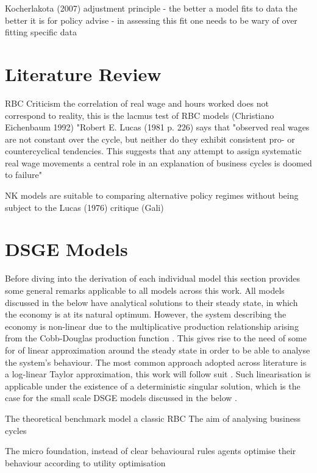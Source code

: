 \documentclass[12pt,a4paper,english]{article} %
\let\oldsection\section
\renewcommand\section{\clearpage\oldsection}
\begin{document}
	Kocherlakota (2007) adjustment principle
	- the better a model fits to data the better it is for policy advise
	- in assessing this fit one needs to be wary of over fitting specific data
	
	\section{Literature Review}
		RBC Criticism
	the correlation of real wage and hours worked does not correspond to reality, this is the lacmus test of RBC models (Christiano Eichenbaum 1992)
	"Robert E. Lucas (1981 p. 226) says that "observed real wages are not constant over the cycle, but neither do they exhibit consistent pro- or countercyclical tendencies. This suggests that any attempt to assign systematic real wage movements a central role in an explanation of business cycles is doomed to failure" \cite{christiano_current_1992}
	
	NK models are suitable to comparing alternative policy regimes without being subject to the Lucas (1976) critique (Gali)	



	\section{DSGE Models}
	
	Before diving into the derivation of each individual model this section provides some general remarks applicable to all models across this work. All models discussed in the below have analytical solutions to their steady state, in which the economy is at its natural optimum. However, the system describing the economy is non-linear due to the multiplicative production relationship arising from the Cobb-Douglas production function \cite{campbell_inspecting_1994}. This gives rise to the need of some for of linear approximation around the steady state in order to be able to analyse the system's behaviour. The most common approach adopted across literature is a log-linear Taylor approximation, this work will follow suit \cite{campbell_inspecting_1994}. Such linearisation is applicable under the existence of a deterministic singular solution, which is the case for the small scale DSGE models discussed in the below \cite{herbst_bayesian_2016}.
	
	The theoretical benchmark model a classic RBC 
	The aim of analysing business cycles
	
	The micro foundation, instead of clear behavioural rules agents optimise their behaviour according to utility optimisation
	
\end{document}
